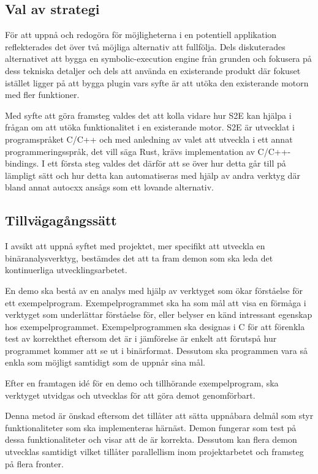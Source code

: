 \subsection{Val av strategi} 
För att uppnå och redogöra för möjligheterna i en
potentiell applikation reflekterades det över två möjliga alternativ att
fullfölja. Dels diskuterades alternativet att bygga en symbolic-execution engine
från grunden och fokusera på dess tekniska detaljer och dels att använda en
existerande produkt där fokuset istället ligger på att bygga plugin vars syfte
är att utöka den existerande motorn med fler funktioner. 

Med syfte att göra framsteg valdes det att kolla vidare hur S2E kan hjälpa i
frågan om att utöka funktionalitet i en existerande motor. S2E är utvecklat
i programspråket C/C++ och med anledning av valet att utveckla i ett
annat programmeringsspråk, det vill säga Rust, krävs implementation av
C/C++-bindings. I ett första steg valdes det därför att se över hur detta går till
på lämpligt sätt och hur detta kan automatiseras med hjälp av andra verktyg
där bland annat autocxx ansågs som ett lovande alternativ. 

\subsection{Tillvägagångssätt} 
I avsikt att uppnå syftet med projektet, mer specifikt att utveckla en
binäranalysverktyg, bestämdes det att ta fram demon som ska leda det
kontinuerliga utvecklingsarbetet.

En demo ska bestå av en analys med hjälp av verktyget som ökar förståelse för
ett exempelprogram. Exempelprogrammet ska ha som mål att visa en förmåga i
verktyget som underlättar förståelse för, eller belyser en känd intressant
egenskap hos exempelprogrammet. Exempelprogrammen ska designas i C för att
förenkla test av korrekthet eftersom det är i jämförelse är enkelt att förutspå
hur programmet kommer att se ut i binärformat. Dessutom ska programmen vara så
enkla som möjligt samtidigt som de uppnår sina mål.

Efter en framtagen id\'e för en demo och tillhörande exempelprogram, ska
verktyget utvidgas och utvecklas för att göra demot genomförbart.

Denna metod är önskad eftersom det tillåter att sätta uppnåbara delmål som styr
funktionaliteter som ska implementeras härnäst. Demon fungerar som test på
dessa funktionaliteter och visar att de är korrekta. Dessutom kan flera demon
utvecklas samtidigt vilket tillåter parallellism inom projektarbetet och
framsteg på flera fronter.

